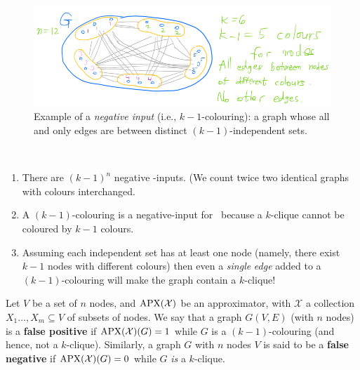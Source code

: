 \begin{description}
\begin{figure}[H]
    \centering
    \includegraphics[width=.6\linewidth]{images/clique2.png}
    \caption{Example of a \emph{negative input} (i.e., $k-1$-colouring): a graph whose all and only edges are between distinct $(k-1)$-independent sets.}
    \label{fig:enter-label}
\end{figure}

\end{description}

\begin{note}\

\begin{enumerate}
\item There are $(k-1)^n$ negative -inputs. (We count twice two identical graphs with colours interchanged.

\item 
 A $(k-1)$-colouring is a negative-input for \cliquenk\ because a $k$-clique cannot be coloured by $k-1$ colours.
\item
 Assuming each independent set has at least one node (namely,
there exist  $k-1$ nodes with different colours) then even a \emph{single} \emph{edge} added to a $(k-1)$-colouring will make the graph contain a $k$-clique!
\end{enumerate}
\end{note}


Let $V$ be a set of $n$ nodes, and  $\mathrm{APX}(\mathcal X)$ be an   approximator, with  $\mathcal X$ a collection $X_1\dots,X_m\subseteq V$ of subsets of nodes. We say that  a graph $G(V,E)$ (with $n$ nodes) is a \textbf{false positive} if $\mathrm{APX}(\mathcal X)(G)=1$ while $G$ is  a $(k-1)$-colouring (and hence, not a $k$-clique). Similarly, a graph $G$ with $n$ nodes $V$ is said to be a \textbf{false negative} if $\mathrm{APX}(\mathcal X)(G)=0$ while $G$ \emph{is} a $k$-clique.







